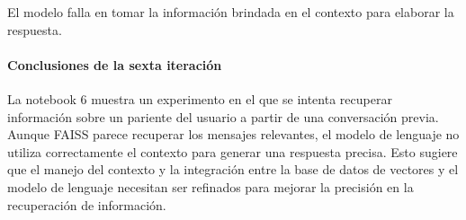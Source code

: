 El modelo falla en tomar la información brindada en el contexto para elaborar la respuesta.

\paragraph{Conclusiones de la sexta iteración}

La notebook 6 muestra un experimento en el que se intenta recuperar información sobre un pariente del usuario a partir de una conversación previa. Aunque FAISS parece recuperar los mensajes relevantes, el modelo de lenguaje no utiliza correctamente el contexto para generar una respuesta precisa. Esto sugiere que el manejo del contexto y la integración entre la base de datos de vectores y el modelo de lenguaje necesitan ser refinados para mejorar la precisión en la recuperación de información. 